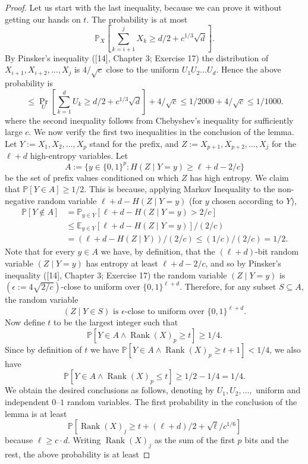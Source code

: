 \documentclass[10pt,a4paper]{article}
\begin{document}
\begin{proof}
Let us start with the last inequality, because we can prove it without getting our hands on $t$. The probability is at most
\[\mathbb P_X\left[\sum_{k=i+1}^jX_k\geq d/2+c^{1/3}\sqrt d\right].\]
By Pinsker's inequality ([14], Chapter 3; Exercise 17) the distribution of $X_{i+1},X_{i+2},\ldots,X_j$ is $4/\sqrt c$ close to the uniform $U_1U_2\ldots U_d$. Hence the above probability is
\[\leq\Pr_U\left[\sum_{k=1}^dU_k\geq d/2+c^{1/3}\sqrt d\right]+4/\sqrt c\leq1/2000+4/\sqrt c\leq1/1000.\]
where the second inequality follows from Chebyshev's inequality for sufficiently large $c$.
We now verify the first two inequalities in the conclusion of the lemma. Let $Y:=X_1,X_2,\ldots,X_p$ stand for the prefix, and $Z:=X_{p+1},X_{p+2},\ldots,X_j$ for the $\ell+d$ high-entropy variables. Let
\[A:=\{y\in\{0,1\}^p:H(Z\mid Y=y)\geq\ell+d-2/c\}\]
be the set of prefix values conditioned on which $Z$ has high entropy. We claim that $\mathbb P[Y\in A]\geq1/2$. This is because, applying Markov Inequality to the non-negative random variable $\ell+d-H(Z\mid Y=y)$ (for $y$ chosen according to $Y$),
\begin{align*}
\mathbb P[Y\notin A]&=\mathbb P_{y\in Y}[\ell+d-H(Z\mid Y=y)>2/c]\\
&\leq\mathbb E_{y\in Y}[\ell+d-H(Z\mid Y=y)]/(2/c)\\
&=(\ell+d-H(Z\mid Y))/(2/c)\leq(1/c)/(2/c)=1/2.
\end{align*}
Note that for every $y\in A$ we have, by definition, that the $(\ell+d)$-bit random variable $(Z\mid Y=y)$ has entropy at least $\ell+d-2/c$, and so by Pinsker's inequality ([14], Chapter 3; Exercise 17) the random variable $(Z\mid Y=y)$ is $(\epsilon:=4\sqrt{2/c})$-close to uniform over $\{0,1\}^{\ell+d}$. Therefore, for any subset $S\subseteq A$, the random variable
\[(Z\mid Y\in S)\text{ is }\epsilon\text{-close to uniform over }\{0,1\}^{\ell+d}.\tag{2}\]
Now define $t$ to be the largest integer such that
\[\mathbb P[Y\in A\wedge\operatorname{Rank}(X)_p\geq t]\geq1/4.\tag{3}\]
Since by definition of $t$ we have $\mathbb P[Y\in A\wedge\operatorname{Rank}(X)_p\geq t+1]<1/4$, we also have
\[\mathbb P[Y\in A\wedge\operatorname{Rank}(X)_p\leq t]\geq1/2-1/4=1/4.\tag{4}\]
We obtain the desired conclusions as follows, denoting by $U_1,U_2,\ldots,$ uniform and independent $0$--$1$ random variables. The first probability in the conclusion of the lemma is at least
\[\mathbb P[\operatorname{Rank}(X)_j\geq t+(\ell+d)/2+\sqrt\ell/c^{1/6}]\]
because $\ell\geq c\cdot d$.
Writing $\operatorname{Rank}(X)_j$ as the sum of the first $p$ bits and the rest, the above probability is at least

\end{proof}
\end{document}
